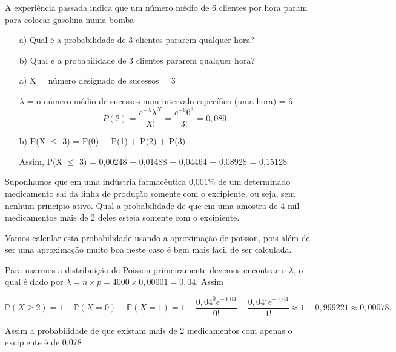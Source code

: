 \documentclass[10pt,a4paper]{article}
\begin{document}
\begin{ex}
	A experiência passada indica que um número médio de 6 clientes por hora param para colocar gasolina numa bomba
	\begin{itemize}
		\item[a)] Qual é a probabilidade de 3 clientes pararem qualquer hora? 
		\item[b)] Qual é a probabilidade de 3 clientes pararem qualquer hora? 
	\end{itemize}
\end{ex}
\begin{sol}
	\begin{itemize}
		\item[a)]X = número designado de sucessos = 3 
		
		$\lambda$ = o número médio de sucessos num intervalo específico (uma hora) = 6 
		\[P(2) = \frac{e^{-\lambda}\lambda^{X}}{X!}	= \frac{e^{-6}6^{3}}{3!} = 0,089\]
		\item[b)]P(X $\leq$ 3) = P(0) + P(1) + P(2) + P(3) 
		
		Assim, P(X $\leq$ 3) = 0,00248 + 0,01488 + 0,04464 + 0,08928 = 0,15128 
	\end{itemize}
\end{sol}

\begin{ex}
	Suponhamos que em uma indústria farmacêutica 0,001$\%$ de um determinado medicamento sai da linha de produção somente com o excipiente, ou seja, sem nenhum princípio ativo. Qual a probabilidade de que em uma amostra de 4 mil medicamentos mais de 2 deles esteja somente com o excipiente.
\end{ex}
\begin{sol}
	Vamos calcular esta probabilidade usando a aproximação de poisson, pois além de ser uma aproximação muito boa neste caso é bem mais fácil de ser calculada.

Para usarmos a distribuição de Poisson primeiramente devemos encontrar o $ \lambda $, o qual é dado por $ \lambda=n\times p=4000\times 0,00001=0,04 $. Assim

\[\mathbb{P}(X\geq 2)=1-\mathbb{P}(X=0)-\mathbb{P}(X=1)=1-\displaystyle \frac{0,04^0e^{-0,04}}{0!}-\frac{0,04^1 e^{-0,04}}{1!}\approx 1-0,999221\approx 0,00078.\] 	

Assim a probabilidade de que existam mais de 2 medicamentos com apenas o excipiente é de 0,078%
\end{sol}
\end{document}
